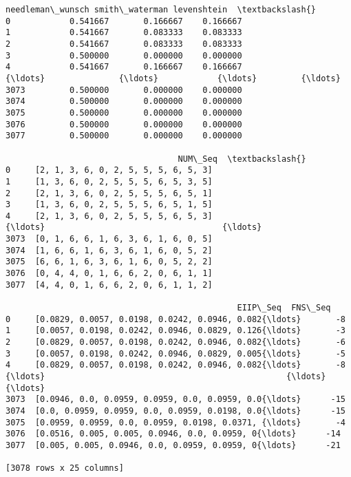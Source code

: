 \documentclass[11pt]{article}
\makeatletter
\newcommand{\boxspacing}{\kern\kvtcb@left@rule\kern\kvtcb@boxsep}
\newcommand{\prompt}[4]{
        \ttfamily\llap{{\color{#2}[#3]:\hspace{3pt}#4}}\vspace{-\baselineskip}
    }
\makeatother
\begin{document}
\begin{tcolorbox}[breakable, size=fbox, boxrule=.5pt, pad at break*=1mm, opacityfill=0]
\begin{Verbatim}[commandchars=\\\{\}]
     needleman\_wunsch smith\_waterman levenshtein  \textbackslash{}
0            0.541667       0.166667    0.166667
1            0.541667       0.083333    0.083333
2            0.541667       0.083333    0.083333
3            0.500000       0.000000    0.000000
4            0.541667       0.166667    0.166667
{\ldots}               {\ldots}            {\ldots}         {\ldots}
3073         0.500000       0.000000    0.000000
3074         0.500000       0.000000    0.000000
3075         0.500000       0.000000    0.000000
3076         0.500000       0.000000    0.000000
3077         0.500000       0.000000    0.000000

                                   NUM\_Seq  \textbackslash{}
0     [2, 1, 3, 6, 0, 2, 5, 5, 5, 6, 5, 3]
1     [1, 3, 6, 0, 2, 5, 5, 5, 6, 5, 3, 5]
2     [2, 1, 3, 6, 0, 2, 5, 5, 5, 6, 5, 1]
3     [1, 3, 6, 0, 2, 5, 5, 5, 6, 5, 1, 5]
4     [2, 1, 3, 6, 0, 2, 5, 5, 5, 6, 5, 3]
{\ldots}                                    {\ldots}
3073  [0, 1, 6, 6, 1, 6, 3, 6, 1, 6, 0, 5]
3074  [1, 6, 6, 1, 6, 3, 6, 1, 6, 0, 5, 2]
3075  [6, 6, 1, 6, 3, 6, 1, 6, 0, 5, 2, 2]
3076  [0, 4, 4, 0, 1, 6, 6, 2, 0, 6, 1, 1]
3077  [4, 4, 0, 1, 6, 6, 2, 0, 6, 1, 1, 2]

                                               EIIP\_Seq  FNS\_Seq
0     [0.0829, 0.0057, 0.0198, 0.0242, 0.0946, 0.082{\ldots}       -8
1     [0.0057, 0.0198, 0.0242, 0.0946, 0.0829, 0.126{\ldots}       -3
2     [0.0829, 0.0057, 0.0198, 0.0242, 0.0946, 0.082{\ldots}       -6
3     [0.0057, 0.0198, 0.0242, 0.0946, 0.0829, 0.005{\ldots}       -5
4     [0.0829, 0.0057, 0.0198, 0.0242, 0.0946, 0.082{\ldots}       -8
{\ldots}                                                 {\ldots}      {\ldots}
3073  [0.0946, 0.0, 0.0959, 0.0959, 0.0, 0.0959, 0.0{\ldots}      -15
3074  [0.0, 0.0959, 0.0959, 0.0, 0.0959, 0.0198, 0.0{\ldots}      -15
3075  [0.0959, 0.0959, 0.0, 0.0959, 0.0198, 0.0371, {\ldots}       -4
3076  [0.0516, 0.005, 0.005, 0.0946, 0.0, 0.0959, 0{\ldots}      -14
3077  [0.005, 0.005, 0.0946, 0.0, 0.0959, 0.0959, 0{\ldots}      -21

[3078 rows x 25 columns]
\end{Verbatim}
\end{tcolorbox}
        
    \begin{tcolorbox}[breakable, size=fbox, boxrule=1pt, pad at break*=1mm,colback=cellbackground, colframe=cellborder]
\prompt{In}{incolor}{ }{\boxspacing}
\begin{Verbatim}[commandchars=\\\{\}]

\end{Verbatim}
\end{tcolorbox}


    
    
    
\end{document}
